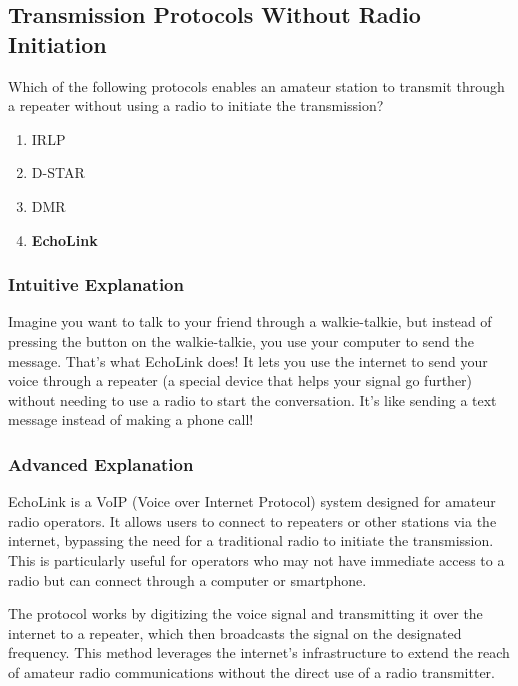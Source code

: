 \subsection{Transmission Protocols Without Radio Initiation}
\label{T8C09}

\begin{tcolorbox}[colback=gray!10!white,colframe=black!75!black,title=T8C09]
Which of the following protocols enables an amateur station to transmit through a repeater without using a radio to initiate the transmission?
\begin{enumerate}[label=\Alph*)]
    \item IRLP
    \item D-STAR
    \item DMR
    \item \textbf{EchoLink}
\end{enumerate}
\end{tcolorbox}

\subsubsection{Intuitive Explanation}
Imagine you want to talk to your friend through a walkie-talkie, but instead of pressing the button on the walkie-talkie, you use your computer to send the message. That's what EchoLink does! It lets you use the internet to send your voice through a repeater (a special device that helps your signal go further) without needing to use a radio to start the conversation. It's like sending a text message instead of making a phone call!

\subsubsection{Advanced Explanation}
EchoLink is a VoIP (Voice over Internet Protocol) system designed for amateur radio operators. It allows users to connect to repeaters or other stations via the internet, bypassing the need for a traditional radio to initiate the transmission. This is particularly useful for operators who may not have immediate access to a radio but can connect through a computer or smartphone.

The protocol works by digitizing the voice signal and transmitting it over the internet to a repeater, which then broadcasts the signal on the designated frequency. This method leverages the internet's infrastructure to extend the reach of amateur radio communications without the direct use of a radio transmitter.

